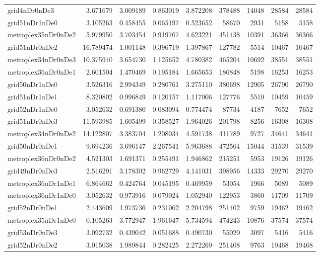 \begin{longtable}{|l|r|r|r|r|r|r|r|r|}
grid4nDr0nDe3 & 3.671679 & 3.009189 & 0.863019 & 3.872208 & 378488 & 14048 & 28584 & 28584 \\
grid51nDr1nDe0 & 3.105263 & 0.458455 & 0.065197 & 0.523652 & 58670 & 2931 & 5158 & 5158 \\
metroplex35nDr0nDe2 & 5.979950 & 3.703454 & 0.919767 & 4.623221 & 451438 & 10391 & 36366 & 36366 \\
grid51nDr0nDe2 & 16.789474 & 1.001148 & 0.396719 & 1.397867 & 127782 & 5514 & 10467 & 10467 \\
metroplex34nDr0nDe3 & 10.375940 & 3.654730 & 1.125652 & 4.780382 & 465204 & 10692 & 38551 & 38551 \\
metroplex36nDr0nDe1 & 2.601504 & 1.470469 & 0.195184 & 1.665653 & 186848 & 5198 & 16253 & 16253 \\
grid50nDr1nDe0 & 3.526316 & 2.994349 & 0.280761 & 3.275110 & 380698 & 12905 & 26790 & 26790 \\
grid51nDr1nDe1 & 8.320802 & 0.996849 & 0.120157 & 1.117006 & 127776 & 5510 & 10459 & 10459 \\
grid52nDr1nDe0 & 3.052632 & 0.691380 & 0.083094 & 0.774474 & 87734 & 4187 & 7652 & 7652 \\
grid51nDr0nDe3 & 11.593985 & 1.605499 & 0.358527 & 1.964026 & 201798 & 8256 & 16308 & 16308 \\
metroplex34nDr0nDe2 & 14.122807 & 3.383704 & 1.208034 & 4.591738 & 411789 & 9727 & 34641 & 34641 \\
grid50nDr0nDe1 & 9.694236 & 3.696147 & 2.267541 & 5.963688 & 472564 & 15044 & 31539 & 31539 \\
metroplex36nDr0nDe2 & 4.521303 & 1.691371 & 0.255491 & 1.946862 & 215251 & 5953 & 19126 & 19126 \\
grid49nDr0nDe3 & 2.516291 & 3.178302 & 0.962729 & 4.141031 & 398956 & 14333 & 29270 & 29270 \\
metroplex36nDr1nDe1 & 6.864662 & 0.424764 & 0.045195 & 0.469959 & 53054 & 1966 & 5089 & 5089 \\
metroplex36nDr1nDe0 & 3.052632 & 0.973916 & 0.079024 & 1.052940 & 122953 & 3860 & 11709 & 11709 \\
grid52nDr0nDe1 & 2.443609 & 1.973736 & 0.231062 & 2.204798 & 251402 & 9759 & 19462 & 19462 \\
metroplex35nDr1nDe0 & 0.105263 & 3.772947 & 1.961647 & 5.734594 & 474243 & 10876 & 37574 & 37574 \\
grid53nDr0nDe3 & 3.092732 & 0.439042 & 0.051688 & 0.490730 & 55020 & 3097 & 5416 & 5416 \\
grid52nDr0nDe2 & 3.015038 & 1.989844 & 0.282425 & 2.272269 & 251408 & 9763 & 19468 & 19468 \\

\end{longtable}
